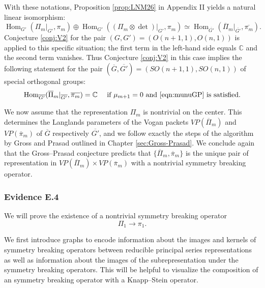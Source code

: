 With these notations,
 Proposition \ref{prop:LNM26} in Appendix II yields
 a natural linear isomorphism:
\[
   {\operatorname{Hom}}_{G'}(\Pi_m|_{G'}, \pi_m)
   \oplus
   {\operatorname{Hom}}_{G'}((\Pi_m\otimes \det)|_{G'}, \pi_m)
   \simeq
   {\operatorname{Hom}}_{\overline{G'}}(\overline \Pi_m|_{\overline{G'}}, \overline{\pi_m}).  
\]
Conjecture \ref{conj:V2} for the pair $(G,G')=(O(n+1,1),O(n,1))$
 is applied to this specific situation;
 the first term in the left-hand side 
 equals
 ${\mathbb{C}}$
 and the second term vanishes.  
Thus Conjecture \ref{conj:V2} in this case implies the following statement
 for the pair $(\overline G,\overline{G'})=(SO(n+1,1),SO(n,1))$
 of special orthogonal groups:
\begin{equation}
\label{eqn:GPm}
   \text{
   ${\operatorname{Hom}}_{\overline{G'}}
   (\overline \Pi_m|_{\overline{G'}}, \overline{\pi_m})={\mathbb{C}}$
   \quad
   \text{if $\mu_{m+1}=0$ and \eqref{eqn:munuGP} is satisfied.}
}
\end{equation}



We now assume that the representation $\Pi_m$ is nontrivial on the center.
This determines the Langlands parameters of  the Vogan packets
 $VP(\overline{\Pi}_m)$ and $VP(\overline{\pi}_m)$ of $\overline G$
 respectively $\overline{G'}$, 
 and we follow exactly the steps of the algorithm by Gross and Prasad outlined
 in Chapter \ref{sec:Gross-Prasad}. 
We conclude again that  the Gross--Prasad conjecture predicts
 that $\{\overline \Pi_m, \overline \pi_m\}$ is the unique pair
 of representation in $VP(\overline \Pi_m)\times VP(\overline \pi_m)$
 with a nontrivial symmetry breaking operator.  




\bigskip
\noindent
\subsubsection{Evidence E.4}
\label{subsec:Evidence4}
We will prove the existence of a nontrivial symmetry breaking operator 
\[
   \Pi _1 \rightarrow \pi_1.  
\]

We first introduce graphs to encode information
 about the images and kernels of symmetry breaking operators
 between reducible principal series representations
 as well as information about the images of the subrepresentation
 under the symmetry breaking operators. 
 This will be helpful to visualize the composition of an symmetry breaking operator with a Knapp--Stein operator.
 
